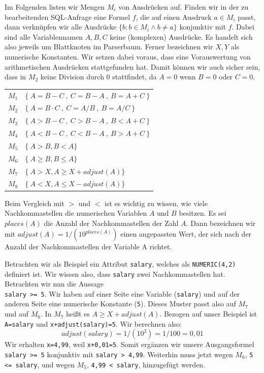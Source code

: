 Im Folgenden listen wir Mengen $M_i$ von Ausdrücken auf. Finden wir in der zu bearbeitenden SQL-Anfrage eine Formel $f$, die auf einen Ausdruck $a\in M_i$ passt, dann verknüpfen wir alle Ausdrücke $\{b : b\in M_i \wedge b \neq a\}$ konjunktiv mit $f$. Dabei sind alle Variablennamen $A,B,C$ keine (komplexen) Ausdrücke. Es handelt sich also jeweils um Blattknoten im Parserbaum. Ferner bezeichnen wir $X,Y$ als numerische Konstanten. Wir setzen dabei voraus, dass eine Vorauswertung von arithmetischen Ausdrücken stattgefunden hat. Damit können wir auch sicher sein, dass in $M_2$ keine Division durch 0 stattfindet, da $A=0$ wenn $B=0$ oder $C=0$.\\

\begin{tabular}{ll}
$M_1$ & $\{\ A=B-C\ ,\ C=B-A\ ,\ B=A+C\ \}$\\
$M_2$ & $\{\ A=B\cdot C\ ,\ C=A / B\ ,\ B=A / C\ \}$\\
$M_3$ & $\{\ A>B-C\ ,\ C>B-A\ ,\ B<A+C\ \}$\\
$M_4$ & $\{\ A<B-C\ ,\ C<B-A\ ,\ B>A+C\ \}$\\
$M_5$ & $\{\ A>B, B<A \}$\\
$M_6$ & $\{\ A\geq B, B\leq A \}$\\
$M_7$ & $\{\ A>X, A\geq X+\mathit{adjust}(A) \}$\\
$M_8$ & $\{\ A<X, A\leq X-\mathit{adjust}(A) \}$\\

\end{tabular}

Beim Vergleich mit $>$ und $<$ ist es wichtig zu wissen, wie viele Nachkommastellen die numerischen Variablen $A$ und $B$ besitzen. Es sei $\mathit{places}(A)$ die Anzahl der Nachkommastellen der Zahl $A$. Dann bezeichnen wir mit $\mathit{adjust}(A) = 1 / (10^{\mathit{places}(A)})$ einen angepassten Wert, der sich nach der Anzahl der Nachkommastellen der Variable A richtet.

Betrachten wir als Beispiel ein Attribut \verb|salary|, welches als \verb|NUMERIC(4,2)| definiert ist. Wir wissen also, dass \verb|salary| zwei Nachkommastellen hat. Betrachten wir nun die Aussage\\ \verb|salary >= 5|.
Wir haben auf einer Seite eine Variable (\verb|salary|) und auf der anderen Seite eine numerische Konstante (\verb|5|). Dieses Muster passt also auf $M_7$ und auf $M_6$. In $M_7$ heißt es $A\geq X+\mathit{adjust}(A)$. Bezogen auf unser Beispiel ist \verb|A=salary| und \verb|x+adjust(salary)=5|. Wir berechnen also: 
$$\mathit{adjust}(\mathit{salary}) = 1 / (10^{2}) = 1/100 = 0,01$$
Wir erhalten \verb|x=4,99|, weil \verb|x+0,01=5|. Somit ergänzen wir unsere Ausgangsformel\\ \verb|salary >= 5| konjunktiv mit \verb|salary > 4,99|. Weiterhin muss jetzt wegen $M_6$, \verb|5 <= salary|, und wegen $M_5$, \verb|4,99 < salary|, hinzugefügt werden.

